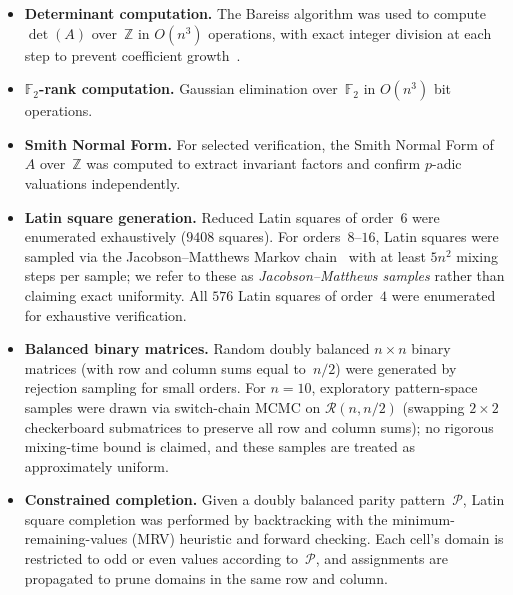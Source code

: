 \documentclass[11pt,a4paper]{article}
\newcommand{\ZZ}{\mathbb{Z}}
\newcommand{\FF}{\mathbb{F}}
\begin{document}
\begin{itemize}[leftmargin=2em]
  \item \textbf{Determinant computation.} The Bareiss algorithm was used
        to compute $\det(A)$ over~$\ZZ$ in $O(n^3)$ operations, with
        exact integer division at each step to prevent coefficient
        growth~\cite{Bareiss68}.

  \item \textbf{$\FF_2$-rank computation.}  Gaussian elimination
        over~$\FF_2$ in $O(n^3)$ bit operations.

  \item \textbf{Smith Normal Form.} For selected verification, the
        Smith Normal Form of~$A$ over~$\ZZ$ was computed to extract
        invariant factors and confirm $p$-adic valuations independently.

  \item \textbf{Latin square generation.}  Reduced Latin squares of
        order~$6$ were enumerated exhaustively ($9408$ squares).  For
        orders~$8$--$16$, Latin squares were sampled
        via the Jacobson--Matthews Markov chain~\cite{JM96} with at
        least $5n^2$ mixing steps per sample; we refer to these as
        \emph{Jacobson--Matthews samples} rather than claiming exact
        uniformity.  All $576$ Latin squares of
        order~$4$ were enumerated for exhaustive verification.

  \item \textbf{Balanced binary matrices.}  Random doubly balanced
        $n\times n$ binary matrices (with row and column sums equal
        to~$n/2$) were generated by rejection sampling for small
        orders.  For $n=10$, exploratory pattern-space samples
        were drawn via switch-chain MCMC on $\mathcal{R}(n,n/2)$
        (swapping $2\times 2$ checkerboard submatrices to preserve
        all row and column sums); no rigorous mixing-time bound
        is claimed, and these samples are treated as approximately
        uniform.

  \item \textbf{Constrained completion.}  Given a doubly balanced
        parity pattern~$\mathcal{P}$, Latin square completion was
        performed by backtracking with the minimum-remaining-values
        (MRV) heuristic and forward checking.  Each cell's domain is
        restricted to odd or even values according to~$\mathcal{P}$,
        and assignments are propagated to prune domains in the same
        row and column.
\end{itemize}
\end{document}

